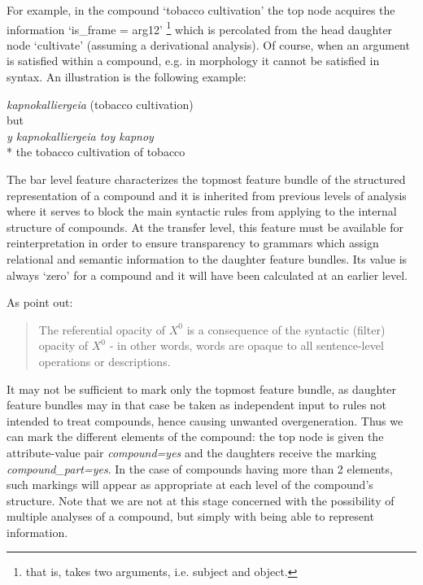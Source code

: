 For   example,   in  the compound `tobacco cultivation'  the  top  
node  acquires the information `is\_frame = arg12'
\footnote{that is, takes two arguments, i.e. subject and object.}
which is 
percolated from the head daughter  node  `cultivate' (assuming  a 
derivational  analysis).   Of   course,   when  an  argument   is 
satisfied  within a compound,  e.g.  in morphology it  cannot  be 
satisfied in syntax.  An illustration is the following example:

\begin{center} 
    {\em  kapnokalliergeia} (tobacco cultivation) \\
but\\

{\em     * y kapnokalliergeia toy kapnoy}\\
     * the tobacco cultivation of tobacco\\
\end{center}


The   bar  level  feature  characterizes  the   topmost   feature 
bundle  of the structured representation of a compound and it  is 
inherited  from previous levels of analysis where  it serves   to  
block  the main syntactic rules from applying  to   the  internal  
structure   of compounds.   At the transfer level,   this feature 
must   be  available  for reinterpretation  in  order  to  ensure 
transparency  to grammars which assign  relational  and  semantic  
information   to   the  daughter feature bundles.  Its  value  is 
always `zero' for a compound and it will have been calculated  at 
an earlier level.

As  point   out:
\begin{quotation}
   The 
referential  opacity  of  $X^0$ is a consequence  of  the  syntactic 
(filter) opacity of $X^0$ - in other words,  words are opaque to all 
sentence-level operations or descriptions.
\end{quotation}
               
It  may  not   be sufficient to mark only  the  topmost   feature  
bundle,  as daughter feature bundles may in that case be taken as 
independent  input   to  rules not intended to  treat  compounds,  
hence   causing unwanted  overgeneration.   Thus we can mark  the 
different  elements of the compound:  the top node  is given  the  
attribute-value  pair  {\em compound=yes} and the  daughters  receive  
the marking {\em compound\_part=yes}.  In the case of compounds having 
more than 2 elements, such markings will appear as appropriate at 
each  level of the compound's structure.  Note that we are not at 
this stage concerned with the possibility of multiple analyses of 
a compound,  but simply with being able to represent information. 


